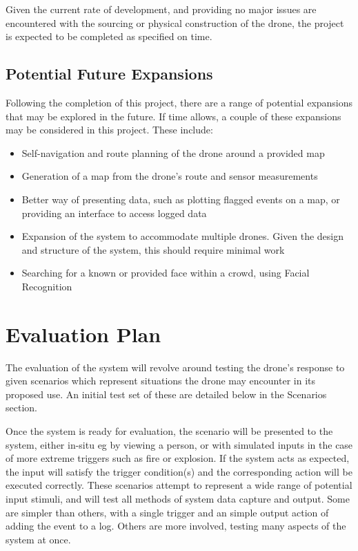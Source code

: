 \documentclass{article}
\begin{document}
\vspace{\baselineskip} \noindent
Given the current rate of development, and providing no major issues are encountered with the sourcing or physical construction of the drone, the project is expected to be completed as specified on time.

\subsection{Potential Future Expansions}
Following the completion of this project, there are a range of potential expansions that may be explored in the future. If time allows, a couple of these expansions may be considered in this project. These include:
\begin{itemize}
    \item Self-navigation and route planning of the drone around a provided map
    \item Generation of a map from the drone's route and sensor measurements
    \item Better way of presenting data, such as plotting flagged events on a map, or providing an interface to access logged data
    \item Expansion of the system to accommodate multiple drones. Given the design and structure of the system, this should require minimal work
    \item Searching for a known or provided face within a crowd, using Facial Recognition
\end{itemize}


\section{Evaluation Plan}
The evaluation of the system will revolve around testing the drone's response to given scenarios which represent situations the drone may encounter in its proposed use. An initial test set of these are detailed below in the Scenarios section.

\vspace{\baselineskip} \noindent
Once the system is ready for evaluation, the scenario will be presented to the system, either in-situ eg by viewing a person, or with simulated inputs in the case of more extreme triggers such as fire or explosion. If the system acts as expected, the input will satisfy the trigger condition(s) and the corresponding action will be executed correctly. These scenarios attempt to represent a wide range of potential input stimuli, and will test all methods of system data capture and output. Some are simpler than others, with a single trigger and an simple output action of adding the event to a log. Others are more involved, testing many aspects of the system at once.
\end{document}
